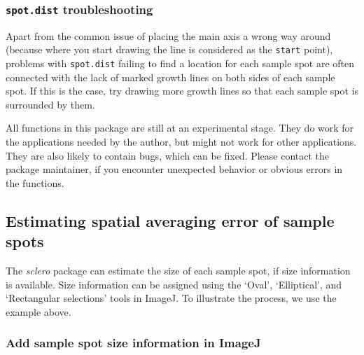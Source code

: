 \documentclass[11pt, a4paper]{article}
\newcommand{\sclero}{\textit{sclero}\xspace}
\begin{document}
\subsubsection{\texttt{spot.dist} troubleshooting}

Apart from the common issue of placing the main axis a wrong way around (because where you start drawing the line is considered as the \texttt{start} point), problems with \texttt{spot.dist} failing to find a location for each sample spot are often connected with the lack of marked growth lines on both sides of each sample spot. If this is the case, try drawing more growth lines so that each sample spot is surrounded by them. %

All functions in this package are still at an experimental stage. They do work for the applications needed by the author, but might not work for other applications. They are also likely to contain bugs, which can be fixed. Please contact the package maintainer, if you encounter unexpected behavior or obvious errors in the functions.

\clearpage
\subsection{Estimating spatial averaging error of sample spots} \label{sec:averaging_error}

The \sclero package can estimate the size of each sample spot, if size information is available. Size information can be assigned using the `Oval', `Elliptical', and `Rectangular selections' tools in ImageJ. To illustrate the process, we use the example above. 

\subsubsection{Add sample spot size information in ImageJ}
\end{document}

